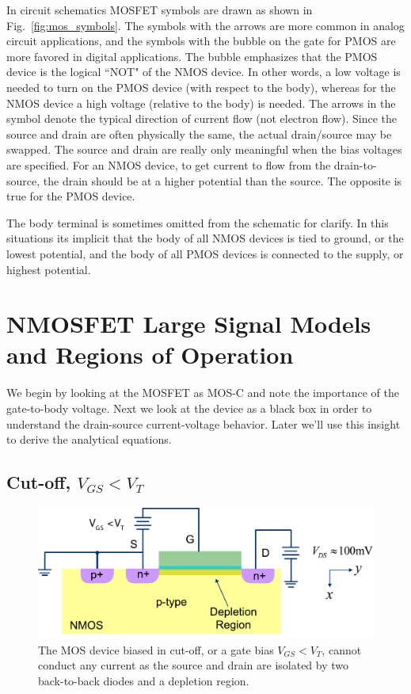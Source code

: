 In circuit schematics MOSFET symbols are drawn as shown in Fig.~\ref{fig:mos_symbols}.  The symbols with the arrows are more common in analog circuit applications, and the symbols with the bubble on the gate for PMOS are more favored in digital applications.  The bubble emphasizes that the PMOS device is the logical ``NOT" of the NMOS device. In other words, a low voltage is needed to turn on the PMOS device (with respect to the body), whereas for the NMOS device a high voltage (relative to the body) is needed.  The arrows in the symbol denote the typical direction of current flow (not electron flow).  Since the source and drain are often physically the same, the actual drain/source may be swapped.  The source and drain are really only meaningful when the bias voltages are specified. For an NMOS device, to get current to flow from the drain-to-source, the drain should be at a higher potential than the source.  The opposite is true for the PMOS device.

The body terminal is sometimes omitted from the schematic for clarify.  In this situations its implicit that the body of all NMOS devices is tied to ground, or the lowest potential, and the body of all PMOS devices is connected to the supply, or highest potential.

 



\section{NMOSFET Large Signal Models and Regions of Operation}

We begin by looking at the MOSFET as MOS-C and note the importance of the gate-to-body voltage.  Next we look at the device as a black box in order to understand the drain-source current-voltage behavior.  Later we'll use this insight to derive the analytical equations.

\subsection{Cut-off, $V_{GS} < V_T$}

\begin{figure}[tb]
\begin{center}
\includegraphics[width=.75\columnwidth]{mos_cutoff}
\end{center}
\caption{The MOS device biased in cut-off, or a gate bias $V_{GS} < V_T$, cannot conduct any current as the source and drain are isolated by two back-to-back diodes and a depletion region.} \label{fig:mos_cutoff}
\end{figure}


